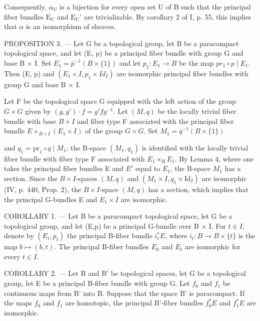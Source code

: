 Consequently, \(\alpha_{\mathrm{U}}\) is a bijection for every open set U of B such that the principal fiber bundles \(\mathrm{E_U}\) and \(\mathrm{E_U}'\) are trivializable. By corollary 2 of I, p. 55, this implies that \(\alpha\) is an isomorphism of sheaves.

PROPOSITION 3. --- Let G be a topological group, let B be a paracompact topological space, and let (E, p) be a principal fiber bundle with group G and base B × I. Set \(E_{1} = \overline{p}^{-1}(B \times \{1\})\) and let \(p_{1}: E_{1} \to B\) be the map \(pr_{1} \circ p \mid E_{1}\). Then (E, p) and \((E_{1} \times I, p_{1} \times Id_{I})\) are isomorphic principal fiber bundles with group G and base B × I.

Let F be the topological space G equipped with the left action of the group \(G \times G\) given by \((g, g') \cdot f = g' fg^{-1}\). Let \((M, q)\) be the locally trivial fiber bundle with base \(B \times I\) and fiber type F associated with the principal fiber bundle \(E \times_{B \times I}(E_1 \times I)\) of the group \(G \times G\). Set \(M_1 = \overline{q}^{-1}(B \times \{1\})\)

and \(q_1 = \mathrm{pr}_1 \circ q \mid M_1\); the B-space \((M_1, q_1)\) is identified with the locally trivial fiber bundle with fiber type F associated with \(E_1 \times_\mathrm{B} E_1\). By Lemma 4, where one takes the principal fiber bundles E and \(E'\) equal to \(E_1\), the B-space \(M_1\) has a section. Since the \(B \times I\)-spaces \((M, q)\) and \((M_1 \times I, q_1 \times \mathrm{Id}_{I})\) are isomorphic (IV, p. 440, Prop. 2), the \(B \times I\)-space \((M, q)\) has a section, which implies that the principal G-bundles E and \(E_1 \times I\) are isomorphic.

COROLLARY 1. --- Let B be a paracompact topological space, let G be a topological group, and let (E,p) be a principal G-bundle over B × I. For \(t \in I\), denote by \((E_{t}, p_{t})\) the principal B-fiber bundle \(i_{t}^{*}E\), where \(i_{t}: B \to B \times \{t\}\) is the map \(b \mapsto (b, t)\). The principal B-fiber bundles \(E_{0}\) and \(E_{t}\) are isomorphic for every \(t \in I\).

COROLLARY 2. --- Let B and B' be topological spaces, let G be a topological group, let E be a principal B-fiber bundle with group G. Let \(f_0\) and \(f_1\) be continuous maps from B' into B. Suppose that the space B' is paracompact. If the maps \(f_0\) and \(f_1\) are homotopic, the principal B'-fiber bundles \(f_0^*E\) and \(f_1^*E\) are isomorphic.

